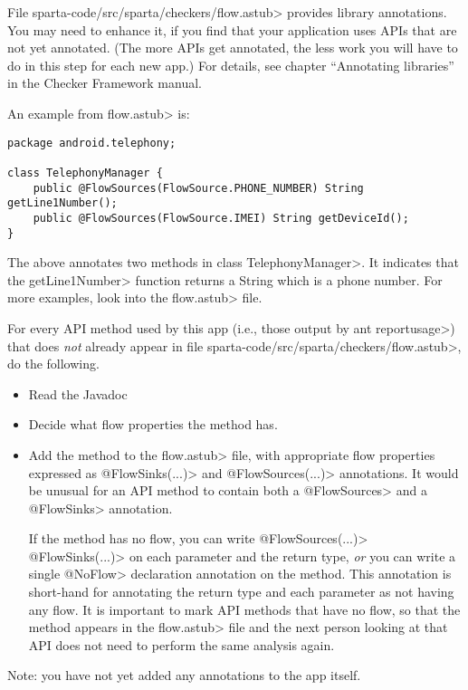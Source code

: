 File \<sparta-code/src/sparta/checkers/flow.astub> provides library
annotations.  You may need to enhance it, if you find that your application
uses APIs that are not yet annotated.
(The  more APIs get annotated, the less work you will have to do in this
step for each new app.)
For details, see chapter
``Annotating libraries'' in the Checker Framework manual.

An example from \<flow.astub> is:

\begin{Verbatim}
package android.telephony;

class TelephonyManager {
    public @FlowSources(FlowSource.PHONE_NUMBER) String getLine1Number();
    public @FlowSources(FlowSource.IMEI) String getDeviceId();
}
\end{Verbatim}

\noindent
The above annotates two methods in class \<TelephonyManager>.
It indicates that the \<getLine1Number> function returns a String which is a
phone number.  For more examples, look into the \<flow.astub> file.

For every API method used by this app (i.e., those output by \<ant
reportusage>) that does \emph{not} already appear in file
\<sparta-code/src/sparta/checkers/flow.astub>, do the following.
\begin{itemize}
\item
Read the Javadoc
\item
Decide what flow properties the method has.
\item
Add the method to the \<flow.astub> file, with
appropriate flow properties expressed as \<@FlowSinks(...)> and
\<@FlowSources(...)> annotations.
It would be unusual for an API method to contain both a \<@FlowSources>
and a \<@FlowSinks> annotation.

If the method has no flow, you can write  
\<@FlowSources(...)> \<@FlowSinks(...)>  on each parameter and the return type, 
\emph{or} you can write a single 
\<@NoFlow> declaration annotation on the method.
This annotation is short-hand for annotating the return type and each
parameter as not having any flow.
It is important to mark API methods that have no flow, so that the method
appears in the \<flow.astub> file and the next person looking at that
API does not need to perform the same analysis again.
\end{itemize}


Note: you have not yet added any annotations to the app itself.


